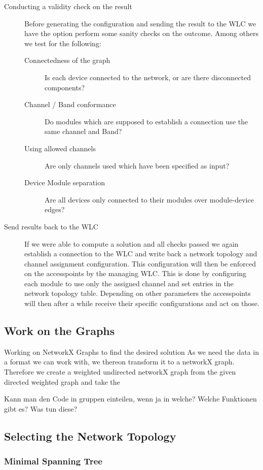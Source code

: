 \begin{description}
    \item[Conducting a validity check on the result]
      Before generating the configuration and sending the result to the WLC we have the option perform some sanity checks on the outcome.
      Among others we test for the following:
	\begin{description}
	 \item [Connectedness of the graph]
	  Is each device connected to the network, or are there disconnected components?
	 \item [Channel / Band conformance]
	  Do modules which are supposed to establish a connection use the same channel and Band?
	 \item [Using allowed channels]
	  Are only channels used which have been specified as input?
	 \item [Device Module separation]
	  Are all devices only connected to their modules over module-device edges?
	\end{description}
    \item [Send results back to the WLC]
      If we were able to compute a solution and all checks passed we again establish a connection to the WLC and write back a network topology and channel assignment
      configuration. This configuration will then be enforced on the accesspoints by the managing WLC.
      This is done by configuring each module to use only the assigned channel and set entries in the network topology table. Depending on other parameters the
      accesspoints will then after a while receive their specific configurations and act on those.
  \end{description}
  
  \subsection{Work on the Graphs} Working on NetworkX Graphs to find the desired solution
    As we need the data in a format we can work with, we thereon transform it to a networkX graph. 
    Therefore we create a weighted undirected networkX graph from the given directed weighted graph and take the 
  

  Kann man den Code in gruppen einteilen, wenn ja in welche? Welche Funktionen gibt es? Was tun diese?
  \subsection{Selecting the Network Topology}
    \subsubsection{Minimal Spanning Tree}
